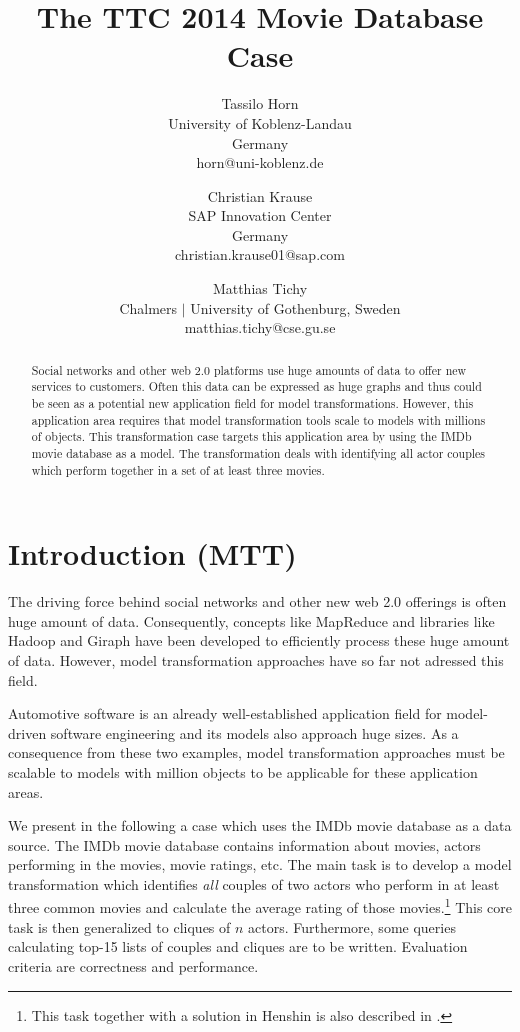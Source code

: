 \documentclass[a4paper,11pt]{article}
\title{The TTC 2014 Movie Database Case}
\author{
Tassilo Horn\\ University of Koblenz-Landau\\ Germany\\ horn@uni-koblenz.de
\and
Christian Krause\\ SAP Innovation Center\\ Germany\\ christian.krause01@sap.com
\and
Matthias Tichy\\ Chalmers $|$ University of Gothenburg, Sweden \\matthias.tichy@cse.gu.se
}
\begin{document}
\maketitle

\begin{abstract}
  Social networks and other web 2.0 platforms use huge amounts of data to offer
  new services to customers. Often this data can be expressed as huge graphs
  and thus could be seen as a potential new application field for model
  transformations. However, this application area requires that model
  transformation tools scale to models with millions of objects. This
  transformation case targets this application area by using the IMDb movie
  database as a model. The transformation deals with identifying all actor
  couples which perform together in a set of at least three movies.
  \end{abstract}
\vskip 32pt


\section{Introduction (MTT)}

The driving force behind social networks and other new web 2.0
offerings is often huge amount of data. Consequently, concepts like
MapReduce \cite{Dean08} and libraries like Hadoop \cite{Hadoop} and
Giraph \cite{Giraph} have been developed to efficiently process these
huge amount of data. However, model transformation approaches have so
far not adressed this field.

Automotive software is an already well-established application field
for model-driven software engineering and its models also approach
huge sizes. As a consequence from these two examples, model
transformation approaches must be scalable to models with million
objects to be applicable for these application areas.

We present in the following a case which uses the IMDb movie database
\cite{IMDBDATA} as a data source. The IMDb movie database contains information
about movies, actors performing in the movies, movie ratings, etc. The main
task is to develop a model transformation which identifies \emph{all} couples
of two actors who perform in at least three common movies and calculate the
average rating of those movies.\footnote{This task together with a solution in Henshin is also
described in \cite{KTG14}.} This core task is then generalized to cliques
of \(n\) actors.  Furthermore, some queries calculating top-15 lists of
couples and cliques are to be written.  Evaluation criteria are correctness and
performance.
\end{document}

